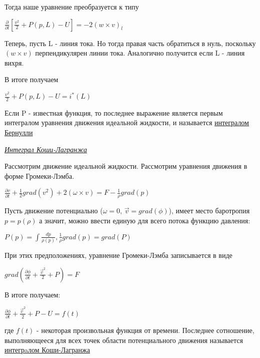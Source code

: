 Тогда наше уравнение преобразуется к типу
\begin{center}
  $\frac{\partial}{\partial l}[ \frac{v^2}{2} + P(p,L) - U] = -2(w\times v)_l$
\end{center}
Теперь, пусть L - линия тока. Но тогда правая часть обратиться в нуль, поскольку $(w\times v)$ перпендикулярен линии тока. Аналогично получится если L - линия вихря.


В итоге получаем
\begin{center}
  $\frac{v^2}{2} + P(p,L) - U = i^*(L)$
\end{center}
Если P - известная функция, то последнее выражение является первым интегралом уравнения движения идеальной жидкости, и называется \underline{интегралом Бернулли}
\begin{center}
  \textit{\underline{Интеграл Коши-Лагранжа}}
\end{center}
Рассмотрим движение идеальной жидкости. Рассмотрим уравнения движения в форме Громеки-Лэмба.
\begin{center}
  $\frac{\partial v}{\partial t} + \frac{1}{2}grad(v^2) + 2(\omega\times v) = F - \frac{1}{\rho}grad(p)$
\end{center}
Пусть движение потенциально ($\omega = 0,\, \vec{v} = grad(\phi)$), имеет место баротропия $p = p(\rho)$ а значит, можно ввести единую для всего потока функцию давления:
\begin{center}
  $P(p) = \int \frac{dp}{\rho(p)}, \frac{1}{\rho}grad(p) = grad(P)$
\end{center}
При этих предположениях, уравнение Громеки-Лэмба записывается в виде
\begin{center}
  $grad(\frac{\partial\phi}{\partial t} + \frac{\vec{v}^2}{2} + P) = F$
\end{center}
В итоге получаем:
\begin{center}
  $\frac{\partial\phi}{\partial t} + \frac{\vec{v}^2}{2} + P - U = f(t)$
\end{center}
где $f(t)$ - некоторая произвольная функция от времени.
Последнее сотношение, выполняющееся для всех точек области потенциального движения называется \underline{интегрaлом Коши-Лагранжа}
